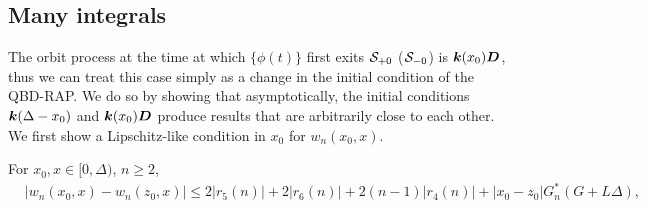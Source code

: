 \subsection{Many integrals}
The orbit process at the time at which \(\{\phi(t)\}\) first exits \(\mathcal{S}_{+0}\) (\(\mathcal{S}_{-0}\)) is \(\boldsymbol k(x_0) \boldsymbol D\), thus we can treat this case simply as a change in the initial condition of the QBD-RAP. We do so by showing that asymptotically, the  initial conditions \(\boldsymbol k(\Delta-x_0)\) and \(\boldsymbol k(x_0)\boldsymbol D\) produce results that are arbitrarily close to each other. We first show a Lipschitz-like condition in \(x_0\) for \(w_n(x_0,x)\).

\begin{cor}\label{cor: awrg}
	For \(x_0,x\in[0,\Delta)\), \(n\geq 2\), 
	\begin{align}
		&\left| w_n(x_0,x)-w_n(z_0,x)\right| 
		\leq 2|r_5(n)| + 2|r_6(n)| + 2(n-1)|r_4(n)| + |x_0-z_0|G_n^*(G+L\Delta), \label{eqn: ssdmm}
	\end{align}
\end{cor}
